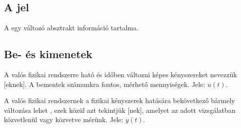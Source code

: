 \documentclass[../main.tex]{subfiles}
\begin{document}
\subsection{A jel}

A  egy változó  absztrakt információ tartalma.

\subsection{Be- és kimenetek}

A valós fizikai rendszerre ható és időben változni képes kényszereket nevezzük
[eknek]. A bementek számunkra fontos, mérhető mennyiségek.
Jele: $u(t)$.

A valós fizikai rendszernek a fizikai kényszerek hatására bekövetkező bármely
változása lehet , ezek közül azt tekintjük
[nek], amelyet az adott vizsgálatban közvetlenül vagy
közvetve mérünk. Jele: $y(t)$.
\end{document}
